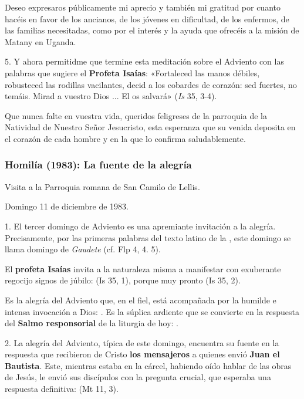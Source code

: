 \begin{body}
\begin{body}
Deseo expresaros públicamente mi aprecio y también mi gratitud por
cuanto hacéis en favor de los ancianos, de los jóvenes en dificultad, de
los enfermos, de las familias necesitadas, como por el interés y la
ayuda que ofrecéis a la misión de Matany en Uganda.

5. Y ahora permitidme que termine esta meditación sobre el Adviento con
las palabras que sugiere el \textbf{Profeta Isaías}: «Fortaleced las
manos débiles, robusteced las rodillas vacilantes, decid a los cobardes
de corazón: sed fuertes, no temáis. Mirad a vuestro Dios ... El os
salvará» (\emph{Is} 35, 3-4).

Que nunca falte en vuestra vida, queridos feligreses de la parroquia de
la Natividad de Nuestro Señor Jesucristo, esta esperanza que su venida
deposita en el corazón de cada hombre y en la que lo confirma
saludablemente.



\subsubsection{Homilía (1983): La fuente de la alegría}

Visita a la Parroquia romana de San Camilo de Lellis.

Domingo 11 de diciembre de 1983.

1. El tercer domingo de Adviento es una apremiante invitación a la alegría. Precisamente, por las primeras palabras del texto latino de la , este domingo se llama domingo de \emph{Gaudete} (cf. Flp 4, 4. 5).

El \textbf{profeta Isaías} invita a la naturaleza misma a manifestar con exuberante regocijo signos de júbilo:  (Is 35, 1), porque muy pronto  (Is 35, 2).

Es la alegría del Adviento que, en el fiel, está acompañada por la humilde e intensa invocación a Dios: . Es la súplica ardiente que se convierte en la respuesta del \textbf{Salmo responsorial} de la liturgia de hoy: .

2. La alegría del Adviento, típica de este domingo, encuentra su fuente en la respuesta que recibieron de Cristo \textbf{los mensajeros} a quienes envió \textbf{Juan el Bautista}. Este, mientras estaba en la cárcel, habiendo oído hablar de las obras de Jesús, le envió sus discípulos con la pregunta crucial, que esperaba una respuesta definitiva:  (Mt 11, 3).


\end{body}
\end{body}
